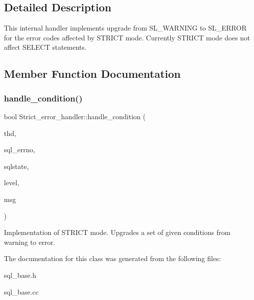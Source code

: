 \subsection{Detailed Description}
This internal handler implements upgrade from S\+L\+\_\+\+W\+A\+R\+N\+I\+NG to S\+L\+\_\+\+E\+R\+R\+OR for the error codes affected by S\+T\+R\+I\+CT mode. Currently S\+T\+R\+I\+CT mode does not affect S\+E\+L\+E\+CT statements. 

\subsection{Member Function Documentation}
\mbox{\label{classStrict__error__handler_a81995f26b8587f9eb6b721e8e382aaeb}} 
\subsubsection{\texorpdfstring{handle\+\_\+condition()}{handle\_condition()}}
{\footnotesize\ttfamily bool Strict\+\_\+error\+\_\+handler\+::handle\+\_\+condition (\begin{DoxyParamCaption}\item[{T\+HD $\ast$}]{thd,  }\item[{uint}]{sql\+\_\+errno,  }\item[{const char $\ast$}]{sqlstate,  }\item[{\mbox{\hyperlink{classSql__condition_ab0602581e19cddb609bfe10c44be4e83}{Sql\+\_\+condition\+::enum\+\_\+severity\+\_\+level}} $\ast$}]{level,  }\item[{const char $\ast$}]{msg }\end{DoxyParamCaption})\hspace{0.3cm}{\ttfamily [virtual]}}

Implementation of S\+T\+R\+I\+CT mode. Upgrades a set of given conditions from warning to error. 

The documentation for this class was generated from the following files\+:\begin{DoxyCompactItemize}
\item 
sql\+\_\+base.\+h\item 
sql\+\_\+base.\+cc\end{DoxyCompactItemize}
